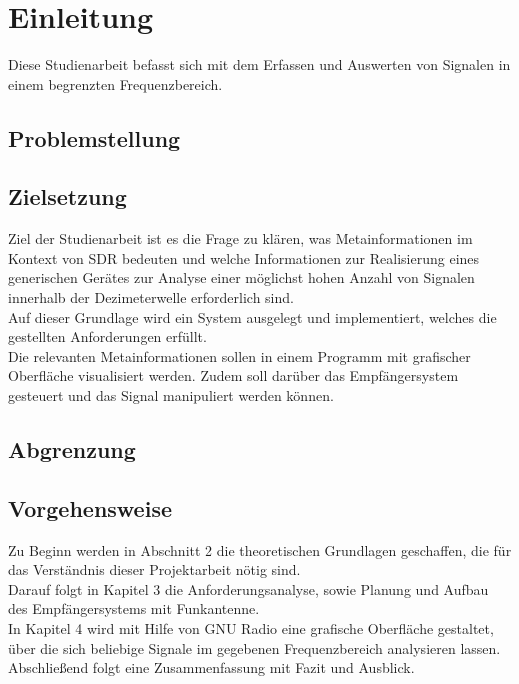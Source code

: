
\chapter{Einleitung}
Diese Studienarbeit befasst sich mit dem Erfassen und Auswerten von Signalen in einem begrenzten Frequenzbereich.  

\section{Problemstellung}


\section{Zielsetzung}
Ziel der Studienarbeit ist es die Frage zu klären, was Metainformationen im Kontext von \ac{SDR} bedeuten und welche Informationen zur Realisierung eines generischen Gerätes zur Analyse einer möglichst hohen Anzahl von Signalen innerhalb der Dezimeterwelle erforderlich sind.\\

Auf dieser Grundlage wird ein System ausgelegt und implementiert, welches die gestellten Anforderungen erfüllt.\\

Die relevanten Metainformationen sollen in einem Programm mit grafischer Oberfläche visualisiert werden. Zudem soll darüber das Empfängersystem gesteuert und das Signal manipuliert werden können.





\section{Abgrenzung}


\section{Vorgehensweise}
Zu Beginn werden in Abschnitt 2 die theoretischen Grundlagen geschaffen, die für das Verständnis dieser Projektarbeit nötig sind. \\
Darauf folgt in Kapitel 3 die Anforderungsanalyse, sowie Planung und Aufbau des Empfängersystems mit Funkantenne.\\
In Kapitel 4 wird mit Hilfe von GNU Radio eine grafische Oberfläche gestaltet, über die sich beliebige Signale im gegebenen Frequenzbereich analysieren lassen.\\
Abschließend folgt eine Zusammenfassung mit Fazit und Ausblick.

